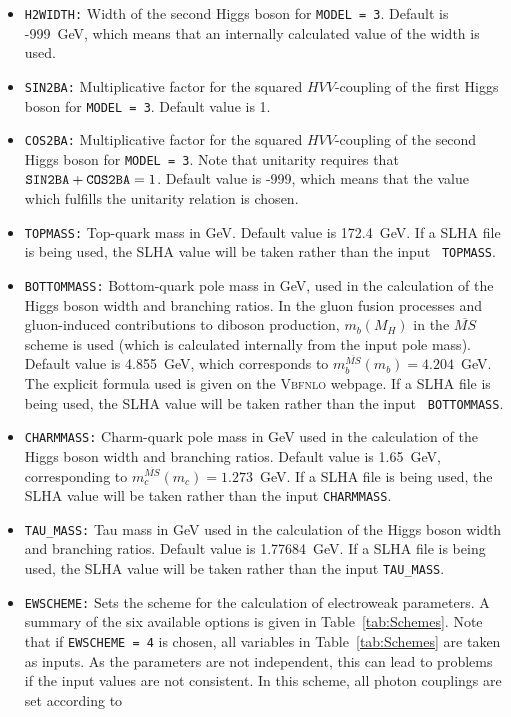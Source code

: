 \documentclass[english,12pt]{article}
\begin{document}
\begin{itemize}
\item{\tt H2WIDTH:} Width of the second Higgs boson for {\tt MODEL = 3}.
Default is -999~GeV, which means that an internally calculated value of
the width is used.
\item{\tt SIN2BA:} Multiplicative factor for the squared $HVV$-coupling of
the first Higgs boson for {\tt MODEL = 3}. Default value is 1.
\item{\tt COS2BA:} Multiplicative factor for the squared $HVV$-coupling of
the second Higgs boson for {\tt MODEL = 3}. Note that unitarity requires that
${\tt SIN2BA}+{\tt COS2BA}=1$. Default value is -999, which means that the
value which fulfills the unitarity relation is chosen.
\item {\tt TOPMASS:} Top-quark mass in GeV. Default value is 172.4~GeV.  If a
SLHA file is being used, the SLHA value will be taken rather than the input {\tt
TOPMASS}.
\item {\tt BOTTOMMASS:} Bottom-quark pole mass in GeV, used in the calculation
of the Higgs boson width and branching ratios.  In the gluon fusion processes
and gluon-induced contributions to diboson production, $m_{b}(M_{H})$ in the $\overline{MS}$ scheme is used
(which is calculated internally from the input pole mass). Default value is
4.855~GeV, which corresponds to $m_{b}^{\overline{MS}}(m_{b}) = 4.204$~GeV.  The
explicit formula used is given on the \textsc{Vbfnlo} webpage.  If a SLHA file
is being used, the SLHA value will be taken rather than the input {\tt
BOTTOMMASS}.
\item {\tt CHARMMASS:} Charm-quark pole mass in GeV used in the calculation of
the Higgs boson width and branching ratios. Default value is 1.65~GeV,
corresponding to $m_{c}^{\overline{MS}}(m_{c}) = 1.273$~GeV.  If a SLHA file is
being used, the SLHA value will be taken rather than the input {\tt CHARMMASS}.
\item {\tt TAU\_MASS:} Tau mass in GeV used in the calculation of the Higgs boson
width and branching ratios. Default value is 1.77684~GeV.  If a SLHA file is
being used, the SLHA value will be taken rather than the input {\tt TAU\_MASS}.
\item {\tt EWSCHEME:} Sets the scheme for the calculation of electroweak
parameters. A summary of the six available options is given in
Table~\ref{tab:Schemes}. Note that if {\tt EWSCHEME = 4} is
chosen, all variables in Table~\ref{tab:Schemes} are taken as inputs.  As the
parameters are not independent, this can lead to problems if the input values
are not consistent.  In this scheme, all photon couplings are set according to

\end{itemize}
\end{document}
